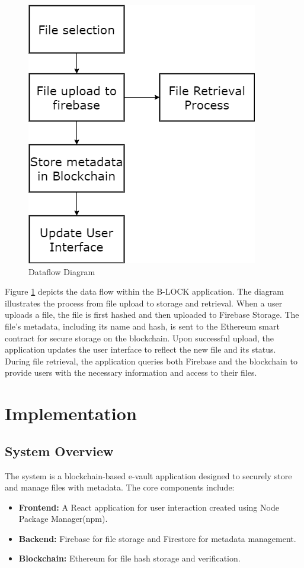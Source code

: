\documentclass[12pt,a4paper]{report}
\begin{document}
\begin{figure}[hbtp]
\centering
\includegraphics[scale=0.7]{./pic/dataflow.png}
\caption{Dataflow Diagram}
\label{fig:dataflow}
\end{figure}
Figure \ref{fig:dataflow} depicts the data flow within the B-LOCK application. The diagram illustrates the process from file upload to storage and retrieval. When a user uploads a file, the file is first hashed and then uploaded to Firebase Storage. The file's metadata, including its name and hash, is sent to the Ethereum smart contract for secure storage on the blockchain. Upon successful upload, the application updates the user interface to reflect the new file and its status. During file retrieval, the application queries both Firebase and the blockchain to provide users with the necessary information and access to their files.



\chapter{Implementation}
\section{System Overview}
\par
The system is a blockchain-based e-vault application designed to securely store and manage files with metadata. The core components include:
\begin{itemize}
   \item \textbf{Frontend:} A React application\cite{reactdocs} for user interaction created using Node Package Manager(npm)\cite{npmdocs}.
   \item \textbf{Backend:} Firebase\cite{firebasedocs} for file storage and Firestore for metadata management.
   \item \textbf{Blockchain:} Ethereum for file hash storage and verification.
\end{itemize}
\end{document}
